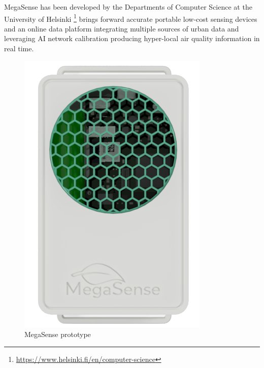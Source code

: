 		
			MegaSense has been developed by the Departments of Computer Science at the University of Helsinki \footnote{\url{https://www.helsinki.fi/en/computer-science}} brings forward accurate portable low-cost sensing devices and an online data platform integrating multiple sources of urban data and leveraging AI network calibration producing hyper-local air quality information in real time.
				
			\noindent
			\begin{minipage}{0.35\textwidth}
				\begin{figure}[H]
					\centering
					\includegraphics[width=.8\textwidth]{resources/img/chap2/megasense}
					\caption{MegaSense prototype}
					\label{img:megasense_picture}
				\end{figure}
				\vspace{3mm}
			\end{minipage}%
			\hfill%
